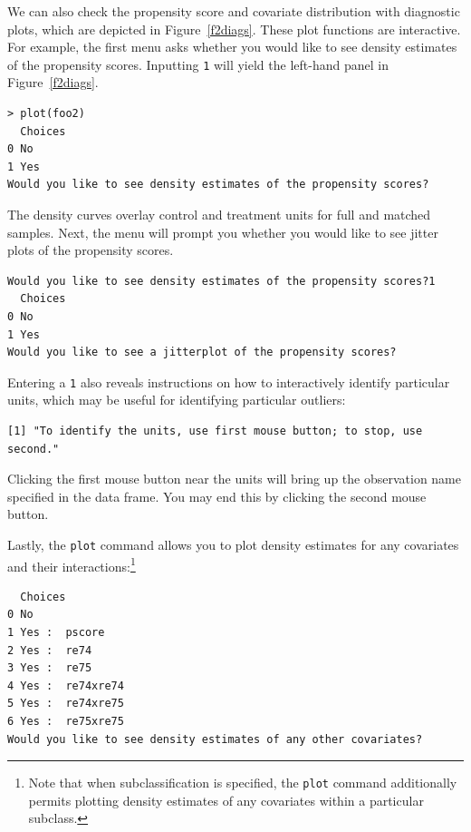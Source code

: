 \documentclass[oneside,letterpaper,titlepage]{article}
\begin{document}
We can also check the propensity score and covariate distribution with
diagnostic plots, which are depicted in Figure~\ref{f2diags}.  These
plot functions are interactive.  For example, the first menu asks
whether you would like to see density estimates of the propensity
scores.  Inputting \texttt{1} will yield the left-hand panel in
Figure~\ref{f2diags}.

\begin{verbatim}
> plot(foo2)
  Choices
0 No     
1 Yes    
Would you like to see density estimates of the propensity scores?
\end{verbatim}

The density curves overlay control and treatment units for full and
matched samples.  Next, the menu will prompt you whether you would
like to see jitter plots of the propensity scores.

\begin{verbatim}
Would you like to see density estimates of the propensity scores?1
  Choices
0 No     
1 Yes    
Would you like to see a jitterplot of the propensity scores?
\end{verbatim}

Entering a \texttt{1} also reveals instructions on how to
interactively identify particular units, which may be useful for
identifying particular outliers: 

\begin{verbatim}
[1] "To identify the units, use first mouse button; to stop, use
second."
\end{verbatim}

Clicking the first mouse button near the units will bring up the
observation name specified in the data frame.  You may end this by
clicking the second mouse button.

Lastly, the \texttt{plot} command allows you to plot density estimates
for any covariates and their interactions:\footnote{Note that when
  subclassification is specified, the \texttt{plot} command
  additionally permits plotting density estimates of any covariates
  within a particular subclass.}

\begin{verbatim}
  Choices         
0 No              
1 Yes :  pscore   
2 Yes :  re74     
3 Yes :  re75     
4 Yes :  re74xre74
5 Yes :  re74xre75
6 Yes :  re75xre75
Would you like to see density estimates of any other covariates?
\end{verbatim}
\end{document}
